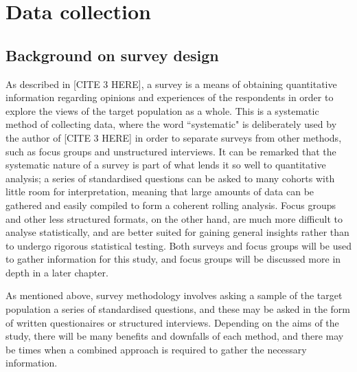 \chapter{Data collection}

\section{Background on survey design}




As described in [CITE 3 HERE], a survey is a means of obtaining quantitative information regarding opinions and 
experiences of the respondents in order to explore the views of the target population as a whole. This is a systematic
method of collecting data, where the word ``systematic" is deliberately used by the author of [CITE 3 HERE] in order to separate
surveys from other methods, such as focus groups and unstructured interviews. It can be remarked that the systematic nature of
a survey is part of what lends it so well to quantitative analysis; a series of standardised questions can be asked to many
cohorts with little room for interpretation, meaning that large amounts of data can be gathered and easily compiled to
form a coherent rolling analysis. Focus groups and other less structured formats, on the other hand, are much more difficult 
to analyse statistically, and are better suited for gaining general insights rather than to undergo rigorous statistical 
testing. Both surveys and focus groups will be used to gather information for this study, and focus groups will be discussed 
more in depth in a later chapter.

As mentioned above, survey methodology involves asking a sample of the target population a series of standardised questions, 
and these may be asked in the form of written questionaires or structured interviews. Depending on the aims of the study, there
will be many benefits and downfalls of each method, and there may be times when a combined approach is required to
gather the necessary information. 

